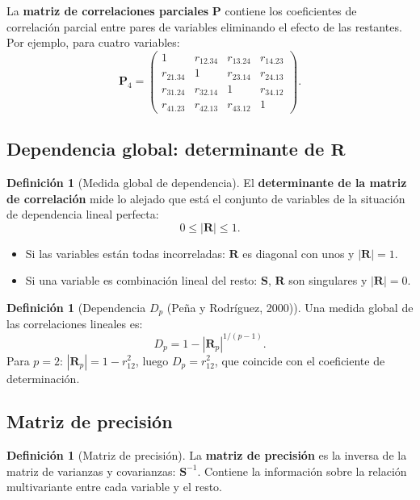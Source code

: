 \documentclass[12pt, a4paper]{article}
\theoremstyle{plain}
\theoremstyle{definition}
\newtheorem{definicion}[teorema]{Definición}
\theoremstyle{remark}
\newcommand{\mat}[1]{\mathbf{#1}}
\begin{document}
La \textbf{matriz de correlaciones parciales} $\mat{P}$ contiene los
coeficientes de correlación parcial entre pares de variables eliminando el
efecto de las restantes. Por ejemplo, para cuatro variables:
\[
  \mat{P}_4 = \begin{pmatrix}
    1 & r_{12.34} & r_{13.24} & r_{14.23} \\
    r_{21.34} & 1 & r_{23.14} & r_{24.13} \\
    r_{31.24} & r_{32.14} & 1 & r_{34.12} \\
    r_{41.23} & r_{42.13} & r_{43.12} & 1
  \end{pmatrix}.
\]

\subsection{Dependencia global: determinante de \texorpdfstring{$\mat{R}$}{R}}

\begin{definicion}[Medida global de dependencia]
El \textbf{determinante de la matriz de correlación} mide lo alejado que está
el conjunto de variables de la situación de dependencia lineal perfecta:
\[
  0\le|\mat{R}|\le1.
\]
\begin{itemize}
  \item Si las variables están todas incorreladas: $\mat{R}$ es diagonal con
        unos y $|\mat{R}|=1$.
  \item Si una variable es combinación lineal del resto: $\mat{S}$, $\mat{R}$
        son singulares y $|\mat{R}|=0$.
\end{itemize}
\end{definicion}

\begin{definicion}[Dependencia $D_p$ (Peña y Rodríguez, 2000)]
Una medida global de las correlaciones lineales es:
\[
  D_p = 1 - |\mat{R}_p|^{1/(p-1)}.
\]
Para $p=2$: $|\mat{R}_p|=1-r_{12}^2$, luego $D_p = r_{12}^2$, que coincide
con el coeficiente de determinación.
\end{definicion}

\subsection{Matriz de precisión}

\begin{definicion}[Matriz de precisión]
La \textbf{matriz de precisión} es la inversa de la matriz de varianzas y
covarianzas: $\mat{S}^{-1}$. Contiene la información sobre la relación
multivariante entre cada variable y el resto.
\end{definicion}
\end{document}
